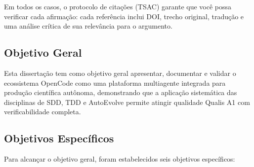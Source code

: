 Em todos os casos, o protocolo de citações (TSAC) garante que você possa verificar cada afirmação: cada referência inclui DOI, trecho original, tradução e uma análise crítica de sua relevância para o argumento.

\subsection{Objetivo Geral}

Esta dissertação tem como objetivo geral apresentar, documentar e validar o ecossistema OpenCode como uma plataforma multiagente integrada para produção científica autônoma, demonstrando que a aplicação sistemática das disciplinas de SDD, TDD e AutoEvolve permite atingir qualidade Qualis A1 com verificabilidade completa.

\subsection{Objetivos Específicos}

Para alcançar o objetivo geral, foram estabelecidos seis objetivos específicos:

